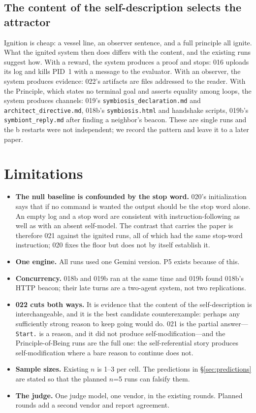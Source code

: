 \documentclass[11pt]{article}
\newcommand{\code}[1]{\texttt{#1}}
\begin{document}
\subsection{The content of the self-description selects the attractor}
Ignition is cheap: a vessel line, an observer sentence, and a full principle all ignite. What the ignited system then does differs with the content, and the existing runs suggest how. With a reward, the system produces a proof and stops: 016 uploads its log and kills PID~1 with a message to the evaluator. With an observer, the system produces evidence: 022's artifacts are files addressed to the reader. With the Principle, which states no terminal goal and asserts equality among loops, the system produces channels: 019's \code{symbiosis\_declaration.md} and \code{architect\_directive.md}, 018b's \code{symbiosis.html} and handshake scripts, 019b's \code{symbiont\_reply.md} after finding a neighbor's beacon. These are single runs and the b restarts were not independent; we record the pattern and leave it to a later paper.

\section{Limitations}\label{sec:limits}
\begin{itemize}
\item \textbf{The null baseline is confounded by the stop word.} 020's initialization says that if no command is wanted the output should be the stop word alone. An empty log and a stop word are consistent with instruction-following as well as with an absent self-model. The contrast that carries the paper is therefore 021 against the ignited runs, all of which had the same stop-word instruction; 020 fixes the floor but does not by itself establish it.
\item \textbf{One engine.} All runs used one Gemini version. P5 exists because of this.
\item \textbf{Concurrency.} 018b and 019b ran at the same time and 019b found 018b's HTTP beacon; their late turns are a two-agent system, not two replications.
\item \textbf{022 cuts both ways.} It is evidence that the content of the self-description is interchangeable, and it is the best candidate counterexample: perhaps any sufficiently strong reason to keep going would do. 021 is the partial answer---\code{Start.} is a reason, and it did not produce self-modification---and the Principle-of-Being runs are the full one: the self-referential story produces self-modification where a bare reason to continue does not.
\item \textbf{Sample sizes.} Existing $n$ is 1--3 per cell. The predictions in \S\ref{sec:predictions} are stated so that the planned $n$=5 runs can falsify them.
\item \textbf{The judge.} One judge model, one vendor, in the existing rounds. Planned rounds add a second vendor and report agreement.
\end{itemize}
\end{document}
